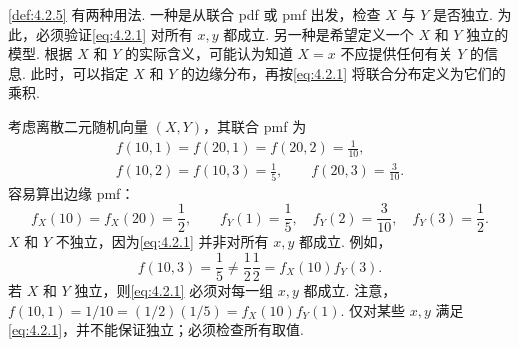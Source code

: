 \autoref{def:4.2.5} 有两种用法. 一种是从联合 pdf 或 pmf 出发，检查 $X$ 与 $Y$ 是否独立. 为此，必须验证\eqref{eq:4.2.1} 对所有 $x,y$ 都成立. 另一种是希望定义一个 $X$ 和 $Y$ 独立的模型. 根据 $X$ 和 $Y$ 的实际含义，可能认为知道 $X=x$ 不应提供任何有关 $Y$ 的信息. 此时，可以指定 $X$ 和 $Y$ 的边缘分布，再按\eqref{eq:4.2.1} 将联合分布定义为它们的乘积.
\begin{example}[独立性的检验——I]\label{ex:4.2.6}
考虑离散二元随机向量 $(X,Y)$，其联合 pmf 为
$$
\begin{gathered}
f(10,1)=f(20,1)=f(20,2)=\frac1{10},\\
f(10,2)=f(10,3)=\frac15,\qquad f(20,3)=\frac3{10}.
\end{gathered}
$$
容易算出边缘 pmf：
$$f_X(10)=f_X(20)=\frac12,\qquad f_Y(1)=\frac15,\quad f_Y(2)=\frac3{10},\quad f_Y(3)=\frac12.$$
$X$ 和 $Y$ 不独立，因为\eqref{eq:4.2.1} 并非对所有 $x,y$ 都成立. 例如，
$$f(10,3)=\frac15\ne\frac12\frac12=f_X(10)f_Y(3).$$
若 $X$ 和 $Y$ 独立，则\eqref{eq:4.2.1} 必须对每一组 $x,y$ 都成立. 注意，$f(10,1)=1/10=(1/2)(1/5)=f_X(10)f_Y(1)$. 仅对某些 $x,y$ 满足\eqref{eq:4.2.1}，并不能保证独立；必须检查所有取值.
\end{example}

